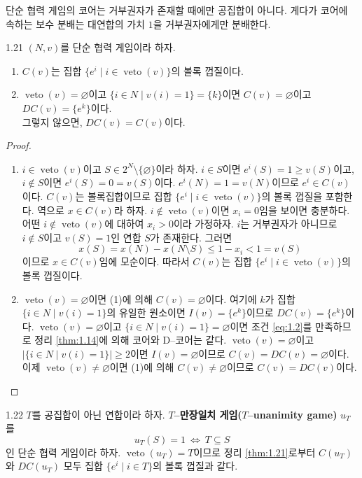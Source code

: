 \documentclass{article}
\numberwithin{equation}{section}
\begin{document}
\newpage
단순 협력 게임의 코어는 거부권자가 존재할 때에만 공집합이 아니다. 게다가 코어에 속하는 보수 분배는 대연합의 가치 $1$을 거부권자에게만 분배한다.

\begin{thm}{}{1.21}
	$(N,v)$를 단순 협력 게임이라 하자.
	\begin{enumerate}[(1)]
		\item $C(v)$는 집합 $\{e^i\mid i\in\operatorname{veto}(v)\}$의 볼록 껍질이다.
		\item $\operatorname{veto}(v)=\varnothing$이고 $\{i\in N\mid v(i)=1\}=\{k\}$이면 $C(v)=\varnothing$이고 $DC(v)=\{e^k\}$이다. \\ 그렇지 않으면, $DC(v)=C(v)$이다.
	\end{enumerate}
\end{thm}

\begin{proof}
	\phantom{}
	\begin{enumerate}[(1)]
		\item $i\in\operatorname{veto}(v)$이고 $S\in 2^N\setminus\{\varnothing\}$이라 하자. $i\in S$이면 $e^i(S)=1\geq v(S)$이고, $i\notin S$이면 $e^i(S)=0=v(S)$이다. $e^i(N)=1=v(N)$이므로 $e^i\in C(v)$이다. $C(v)$는 볼록집합이므로 집합 $\{e^i\mid i\in\operatorname{veto}(v)\}$의 볼록 껍질을 포함한다. 역으로 $x\in C(v)$라 하자. $i\notin\operatorname{veto}(v)$이면 $x_i=0$임을 보이면 충분하다. 어떤 $i\notin\operatorname{veto}(v)$에 대하여 $x_i>0$이라 가정하자. $i$는 거부권자가 아니므로 $i\notin S$이고 $v(S)=1$인 연합 $S$가 존재한다. 그러면
			\[
				x(S)=x(N)-x(N\setminus S)\leq 1-x_i<1=v(S)
			\]
			이므로 $x\in C(v)$임에 모순이다. 따라서 $C(v)$는 집합 $\{e^i\mid i\in\operatorname{veto}(v)\}$의 볼록 껍질이다.
		\item $\operatorname{veto}(v)=\varnothing$이면 (1)에 의해 $C(v)=\varnothing$이다. 여기에 $k$가 집합 $\{i\in N\mid v(i)=1\}$의 유일한 원소이면 $I(v)=\{e^k\}$이므로 $DC(v)=\{e^k\}$이다. $\operatorname{veto}(v)=\varnothing$이고 $\{i\in N\mid v(i)=1\}=\varnothing$이면 조건 \ref{eq:1.2}를 만족하므로 정리 \ref{thm:1.14}에 의해 코어와 D--코어는 같다. $\operatorname{veto}(v)=\varnothing$이고 $\vert\{i\in N\mid v(i)=1\}\vert\geq2$이면 $I(v)=\varnothing$이므로 $C(v)=DC(v)=\varnothing$이다. 이제 $\operatorname{veto}(v)\ne\varnothing$이면 (1)에 의해 $C(v)\ne\varnothing$이므로 $C(v)=DC(v)$이다.\qedhere
	\end{enumerate}
\end{proof}

\begin{example}{}{1.22}
	$T$를 공집합이 아닌 연합이라 하자. \textbf{$T$--만장일치 게임($T$--unanimity game)} $u_T$를
	\[
		u_T(S)=1~\Longleftrightarrow~T\subseteq S
	\]
	인 단순 협력 게임이라 하자. $\operatorname{veto}(u_T)=T$이므로 정리 \ref{thm:1.21}로부터 $C(u_T)$와 $DC(u_T)$ 모두 집합 $\{e^i\mid i\in T\}$의 볼록 껍질과 같다.
\end{example}
\end{document}
